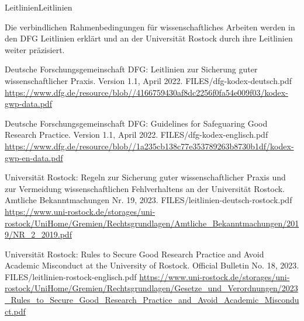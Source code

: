 



\unit{Leitlinien}{Leitlinien}


Die verbindlichen Rahmenbedingungen für
wissenschaftliches Arbeiten werden in den DFG Leitlinien erklärt und an der Universität 
Rostock durch ihre
Leitlinien weiter präzisiert.

\bigskip

{Deutsche Forschungsgemeinschaft DFG: Leitlinien zur Sicherung guter wissenschaftlicher Praxis.
Version 1.1, April 2022.
}
{FILES/dfg-kodex-deutsch.pdf}
{\href{https://www.dfg.de/resource/blob/173732/4166759430af8dc2256f0fa54e009f03/kodex-gwp-data.pdf
}{https://www.dfg.de/resource/blob/\allowbreak{}/4166759430af8dc2256f0fa54e009f03/kodex-gwp-data.pdf
}
}


{Deutsche Forschungsgemeinschaft DFG: Guidelines for Safeguaring
Good Research Practice.
Version 1.1, April 2022.
}
{FILES/dfg-kodex-englisch.pdf}
{\href{https://www.dfg.de/resource/blob/174052/1a235cb138c77e353789263b8730b1df/kodex-gwp-en-data.pdf}{https://www.dfg.de/resource/blob/\allowbreak{}/1a235cb138c77e353789263b8730b1df/kodex-g\allowbreak\relax wp-en-data.pdf}
}

\bigskip


{Universität Rostock: Regeln zur Sicherung guter wissenschaftlicher Praxis und zur
Vermeidung wissenschaftlichen Fehlverhaltens an der Universität Rostock.
Amtliche Bekanntmachungen Nr. 19, 2023.
}
{FILES/leitlinien-deutsch-rostock.pdf}
{
\href{https://www.uni-rostock.de/storages/uni-rostock/UniHome/Gremien/Rechtsgrundlagen/Amtliche\_Bekanntmachungen/2019/NR\_2\_2019.pdf}{https://www.uni-rostock.de/storages/uni-rostock/UniHome/Gremien/Rechtsgrundlagen/\allowbreak\relax Amtliche\_Bekanntmach\allowbreak\relax ungen/2019/NR\_2\_2019.pdf}
}


{Universität Rostock: Rules to Secure Good Research Practice and Avoid Academic Misconduct at the University of Rostock.
Official Bulletin No. 18, 2023.
}
{FILES/leitlinien-rostock-englisch.pdf}
{\href{https://www.uni-rostock.de/storages/uni-rostock/UniHome/Gremien/Rechtsgrundlagen/Gesetze\_und\_Verordnungen/2023\_Rules\_to\_Secure\_Good\_Research\_Practice\_and\_Avoid\_Academic\_Misconduct.pdf}{https://www.uni-rostock.de/storages/uni-rostock/UniHome/Gremien/Rechts\allowbreak\relax grundlagen/\allowbreak\relax Gesetze\_und\_Verordnungen/2023\_Rules\_to\_Secure\_Good\_Research\_Practice\_\allowbreak\relax and\_Avoid\_Academic\_Misconduct.pdf}
}















